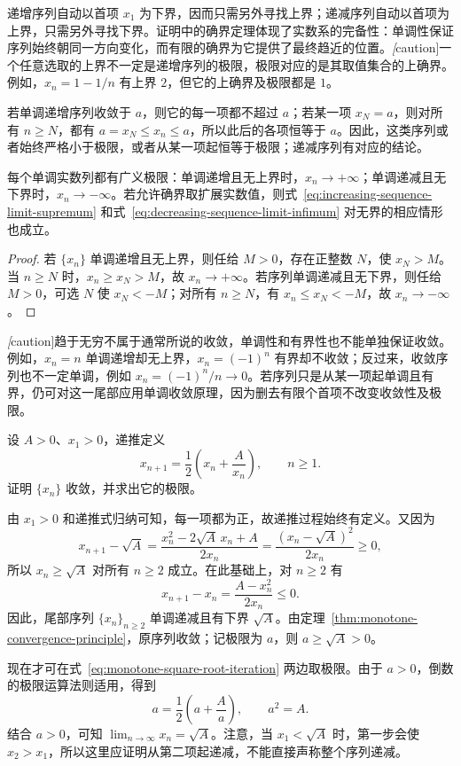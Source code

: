 \documentclass[UTF8,12pt,a4paper,fontset=fandol]{ctexbook}
\begin{document}
递增序列自动以首项 $x_1$ 为下界，因而只需另外寻找上界；递减序列自动以首项为上界，只需另外寻找下界。证明中的确界定理体现了实数系的完备性：单调性保证序列始终朝同一方向变化，而有限的确界为它提供了最终趋近的位置。\emph[caution]{一个任意选取的上界不一定是递增序列的极限，极限对应的是其取值集合的上确界。}例如，$x_n=1-1/n$ 有上界 $2$，但它的上确界及极限都是 $1$。

若单调递增序列收敛于 $a$，则它的每一项都不超过 $a$；若某一项 $x_N=a$，则对所有 $n\geq N$，都有 $a=x_N\leq x_n\leq a$，所以此后的各项恒等于 $a$。因此，这类序列或者始终严格小于极限，或者从某一项起恒等于极限；递减序列有对应的结论。

\begin{corollary}
\label{cor:monotone-sequence-generalized-limit}
每个单调实数列都有广义极限：单调递增且无上界时，$x_n\to+\infty$；单调递减且无下界时，$x_n\to-\infty$。若允许确界取扩展实数值，则式~\eqref{eq:increasing-sequence-limit-supremum} 和式~\eqref{eq:decreasing-sequence-limit-infimum} 对无界的相应情形也成立。
\end{corollary}

\begin{proof}
若 $\{x_n\}$ 单调递增且无上界，则任给 $M>0$，存在正整数 $N$，使 $x_N>M$。当 $n\geq N$ 时，$x_n\geq x_N>M$，故 $x_n\to+\infty$。若序列单调递减且无下界，则任给 $M>0$，可选 $N$ 使 $x_N<-M$；对所有 $n\geq N$，有 $x_n\leq x_N<-M$，故 $x_n\to-\infty$。
\end{proof}

\emph[caution]{趋于无穷不属于通常所说的收敛，单调性和有界性也不能单独保证收敛。}例如，$x_n=n$ 单调递增却无上界，$x_n=(-1)^n$ 有界却不收敛；反过来，收敛序列也不一定单调，例如 $x_n=(-1)^n/n\to0$。若序列只是从某一项起单调且有界，仍可对这一尾部应用单调收敛原理，因为删去有限个首项不改变收敛性及极限。

\begin{example}
\label{ex:monotone-square-root-iteration}
设 $A>0$、$x_1>0$，递推定义
\begin{equation}
    x_{n+1}=\frac12\left(x_n+\frac{A}{x_n}\right),\qquad n\geq1.
    \label{eq:monotone-square-root-iteration}
\end{equation}
证明 $\{x_n\}$ 收敛，并求出它的极限。
\end{example}

\begin{solve}
由 $x_1>0$ 和递推式归纳可知，每一项都为正，故递推过程始终有定义。又因为
\[
    x_{n+1}-\sqrt A
    =\frac{x_n^2-2\sqrt A\,x_n+A}{2x_n}
    =\frac{(x_n-\sqrt A)^2}{2x_n}\geq0,
\]
所以 $x_n\geq\sqrt A$ 对所有 $n\geq2$ 成立。在此基础上，对 $n\geq2$ 有
\[
    x_{n+1}-x_n
    =\frac{A-x_n^2}{2x_n}\leq0.
\]
因此，尾部序列 $\{x_n\}_{n\geq2}$ 单调递减且有下界 $\sqrt A$。由定理~\ref{thm:monotone-convergence-principle}，原序列收敛；记极限为 $a$，则 $a\geq\sqrt A>0$。

现在才可在式~\eqref{eq:monotone-square-root-iteration} 两边取极限。由于 $a>0$，倒数的极限运算法则适用，得到
\[
    a=\frac12\left(a+\frac{A}{a}\right),
    \qquad a^2=A.
\]
结合 $a>0$，可知 $\lim_{n\to\infty}x_n=\sqrt A$。注意，当 $x_1<\sqrt A$ 时，第一步会使 $x_2>x_1$，所以这里应证明从第二项起递减，不能直接声称整个序列递减。
\end{solve}
\end{document}
